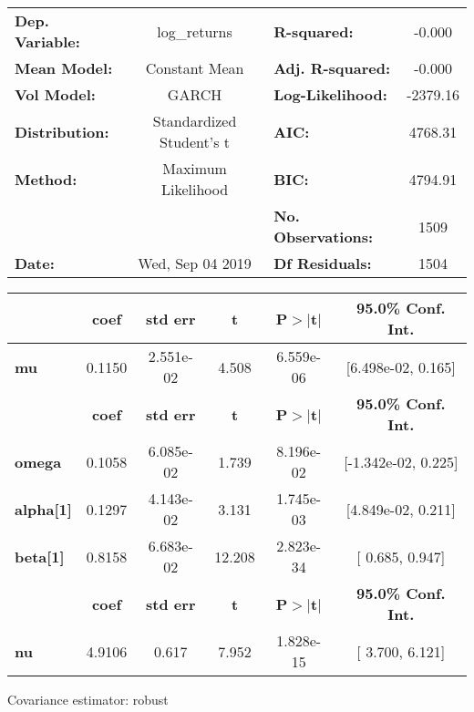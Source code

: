 \begin{center}
\begin{tabular}{lclc}
\toprule
\textbf{Dep. Variable:} &       log\_returns       & \textbf{  R-squared:         } &    -0.000   \\
\textbf{Mean Model:}    &      Constant Mean       & \textbf{  Adj. R-squared:    } &    -0.000   \\
\textbf{Vol Model:}     &          GARCH           & \textbf{  Log-Likelihood:    } &   -2379.16  \\
\textbf{Distribution:}  & Standardized Student's t & \textbf{  AIC:               } &    4768.31  \\
\textbf{Method:}        &    Maximum Likelihood    & \textbf{  BIC:               } &    4794.91  \\
\textbf{}               &                          & \textbf{  No. Observations:  } &    1509     \\
\textbf{Date:}          &     Wed, Sep 04 2019     & \textbf{  Df Residuals:      } &    1504     \\
\bottomrule
\end{tabular}
\begin{tabular}{lccccc}
            & \textbf{coef} & \textbf{std err} & \textbf{t} & \textbf{P$> |$t$|$} & \textbf{95.0\% Conf. Int.}  \\
\midrule
\textbf{mu} &       0.1150  &    2.551e-02     &     4.508  &      6.559e-06       &    [6.498e-02,  0.165]      \\
                  & \textbf{coef} & \textbf{std err} & \textbf{t} & \textbf{P$> |$t$|$} & \textbf{95.0\% Conf. Int.}  \\
\midrule
\textbf{omega}    &       0.1058  &    6.085e-02     &     1.739  &      8.196e-02       &    [-1.342e-02,  0.225]     \\
\textbf{alpha[1]} &       0.1297  &    4.143e-02     &     3.131  &      1.745e-03       &    [4.849e-02,  0.211]      \\
\textbf{beta[1]}  &       0.8158  &    6.683e-02     &    12.208  &      2.823e-34       &     [  0.685,  0.947]       \\
            & \textbf{coef} & \textbf{std err} & \textbf{t} & \textbf{P$> |$t$|$} & \textbf{95.0\% Conf. Int.}  \\
\midrule
\textbf{nu} &       4.9106  &        0.617     &     7.952  &      1.828e-15       &     [  3.700,  6.121]       \\
\bottomrule
\end{tabular}
\end{center}

Covariance estimator: robust
